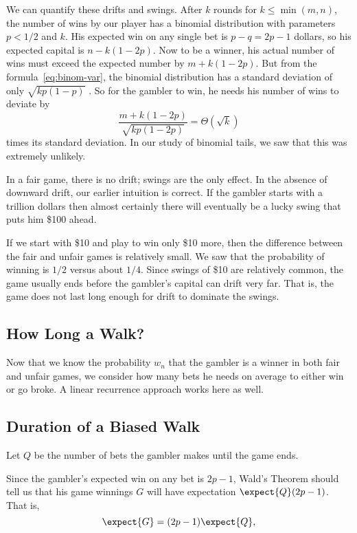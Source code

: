 We can quantify these drifts and swings.  After $k$ rounds for $k \le
\min(m,n)$, the number of wins by our player has a binomial
distribution with parameters $p < 1/2$ and $k$.  His expected win on
any single bet is $p-q = 2p-1$ dollars, so his expected capital is
$n-k(1-2p)$.  Now to be a winner, his actual number of wins must
exceed the expected number by $m+k(1-2p)$.  But from the
formula~\eqref{eq:binom-var}, the binomial distribution has a standard
deviation of only $\sqrt{kp(1-p)}$ .  So for the gambler to win, he
needs his number of wins to deviate by
\[
\frac{m+k(1-2p)}{\sqrt{kp(1-2p)}}=\Theta(\sqrt{k})
\]
times its standard deviation.  In our study of binomial tails, we saw that
this was extremely unlikely.

In a fair game, there is no drift; swings are the only effect.  In the
absence of downward drift, our earlier intuition is correct.  If the
gambler starts with a trillion dollars then almost certainly there
will eventually be a lucky swing that puts him \$100 ahead.

\begin{editingnotes}
If we start with \$10 and play to win only \$10 more, then the difference
between the fair and unfair games is relatively small. We saw that the
probability of winning is $1/2$ versus about $1/4$.  Since swings of \$10
are relatively common, the game usually ends before the gambler's capital
can drift very far.  That is, the game does not last long enough for drift
to dominate the swings.
\end{editingnotes}


\subsection{How Long a Walk?}

Now that we know the probability $w_n$ that the gambler is a winner in
both fair and unfair games, we consider how many bets he needs on average
to either win or go broke.  A linear recurrence approach works here as well. 

\iffalse
\subsection{Duration of a Biased Walk}

Let $Q$ be the number of bets the gambler makes until the game ends.  

Since the gambler's expected win on any bet is $2p-1$, Wald's
Theorem should tell us that his game winnings $G$ will have
expectation $\expect{Q}(2p-1)$.  That is,
\begin{equation}\label{LN12:gw}
\expect{G} = (2p-1)\expect{Q},
\end{equation}

